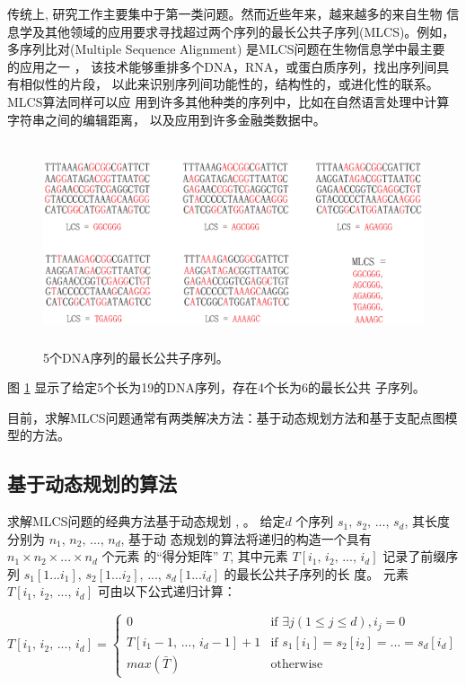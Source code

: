 传统上, 研究工作主要集中于第一类问题。然而近些年来，越来越多的来自生物
信息学及其他领域的应用要求寻找超过两个序列的最长公共子序列(MLCS)。例如，
多序列比对(Multiple Sequence Alignment) 是MLCS问题在生物信息学中最主要
的应用之一 \cite{Katoh2016,Zou2015,Mirarab2015,Bawono2017,Chatzou2015}，
该技术能够重排多个DNA，RNA，或蛋白质序列，找出序列间具有相似性的片段，
以此来识别序列间功能性的，结构性的，或进化性的联系。 MLCS算法同样可以应
用到许多其他种类的序列中，比如在自然语言处理中计算字符串之间的编辑距离，
以及应用到许多金融类数据中。

\begin{figure}[H]
  \centering
  \includegraphics[height=6cm ,width=15cm]{figures/1_Introduction/MLCS.eps}
  \caption{5个DNA序列的最长公共子序列。}
  \label{fig:MLCS}
\end{figure}


图 \ref{fig:MLCS} 显示了给定5个长为19的DNA序列，存在4个长为6的最长公共
子序列。

目前，求解MLCS问题通常有两类解决方法：基于动态规划方法和基于支配点图模
型的方法。

\subsection{基于动态规划的算法}

求解MLCS问题的经典方法基于动态规划 \cite{Smith1981}, \cite{Sankoff1972}。 给定$d$
个序列 $s_1,\, s_2,\,...,\, s_d$, 其长度分别为 $n_1,\, n_2,\, ...,\, n_d$, 基于动
态规划的算法将递归的构造一个具有 $n_1 \times n_2 \times ... \times n_d$ 个元素
的“得分矩阵” $T$, 其中元素 $T[i_1,\, i_2,\, ...,\, i_d]$ 记录了前缀序
列 $s_1[1...i_1]$, $s_2[1...i_2]$, ..., $s_d[1...i_d]$ 的最长公共子序列的长
度。 元素 $T[i_1,\, i_2,\, ...,\, i_d]$ 可由以下公式递归计算：

\begin{equation}
  T[i_1,\, i_2,\, ...,\, i_d] =
  \begin{cases}
    0 & \text{if $\exists j(1 \leq j \leq d), i_j = 0$}\\
    T[i_1-1,\, ...,\, i_d-1] + 1  & \text{if $s_1[i_1] = s_2[i_2] =
      ... = s_d[i_d]$}\\
    max(\bar{T}) & \text{otherwise}
  \end{cases}
\end{equation}

